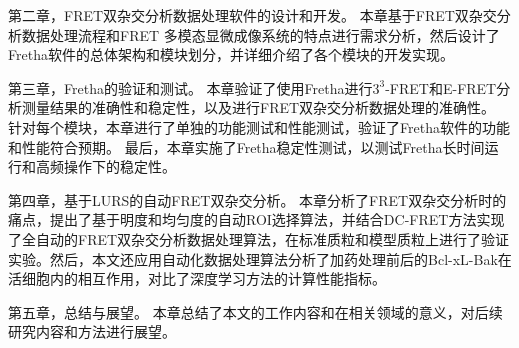 第二章，FRET双杂交分析数据处理软件的设计和开发。
本章基于FRET双杂交分析数据处理流程和FRET 多模态显微成像系统的特点进行需求分析，然后设计了Fretha软件的总体架构和模块划分，并详细介绍了各个模块的开发实现。

第三章，Fretha的验证和测试。
本章验证了使用Fretha进行$3^3$-FRET和E-FRET分析测量结果的准确性和稳定性，以及进行FRET双杂交分析数据处理的准确性。
针对每个模块，本章进行了单独的功能测试和性能测试，验证了Fretha软件的功能和性能符合预期。
最后，本章实施了Fretha稳定性测试，以测试Fretha长时间运行和高频操作下的稳定性。

第四章，基于LURS的自动FRET双杂交分析。
本章分析了FRET双杂交分析时的痛点，提出了基于明度和均匀度的自动ROI选择算法，并结合DC-FRET方法实现了全自动的FRET双杂交分析数据处理算法，在标准质粒和模型质粒上进行了验证实验。然后，本文还应用自动化数据处理算法分析了加药处理前后的Bcl-xL-Bak在活细胞内的相互作用，对比了深度学习方法的计算性能指标。

第五章，总结与展望。
本章总结了本文的工作内容和在相关领域的意义，对后续研究内容和方法进行展望。 

